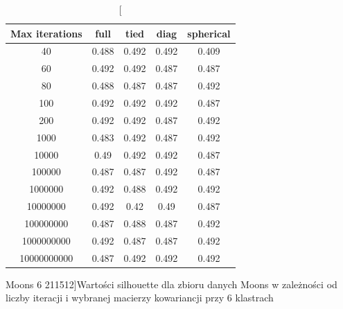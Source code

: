 \documentclass{classrep}
\begin{document}
{{\begin{table}[]
                \begin{minipage}{1\textwidth}
                \centering
                \begin{tabular}{|c|c|c|c|c|}
                \hline
                Max iterations & full & tied & diag & spherical \\ \hline
                40 & 0.488 & 0.492 & 0.492 & 0.409 \\ \hline
                60 & 0.492 & 0.492 & 0.487 & 0.487 \\ \hline
                80 & 0.488 & 0.487 & 0.487 & 0.492 \\ \hline
                100 & 0.492 & 0.492 & 0.492 & 0.487 \\ \hline
                200 & 0.492 & 0.492 & 0.487 & 0.492 \\ \hline
                1000 & 0.483 & 0.492 & 0.487 & 0.492 \\ \hline
                10000 & 0.49 & 0.492 & 0.492 & 0.487 \\ \hline
                100000 & 0.487 & 0.487 & 0.492 & 0.487 \\ \hline
                1000000 & 0.492 & 0.488 & 0.492 & 0.492 \\ \hline
                10000000 & 0.492 & 0.42 & 0.49 & 0.487 \\ \hline
                100000000 & 0.487 & 0.488 & 0.487 & 0.492 \\ \hline
                1000000000 & 0.492 & 0.487 & 0.487 & 0.492 \\ \hline
                10000000000 & 0.487 & 0.492 & 0.492 & 0.492 \\ \hline
                \end{tabular}
                \caption
                [Moons 6 211512]{Wartości silhouette dla zbioru danych Moons w
                zależności od liczby iteracji i wybranej macierzy kowariancji przy 6
                klastrach}
                \label{Moons_6_211512}
                \end{minipage}
                \hfill
                

\end{table}}}
\end{document}

